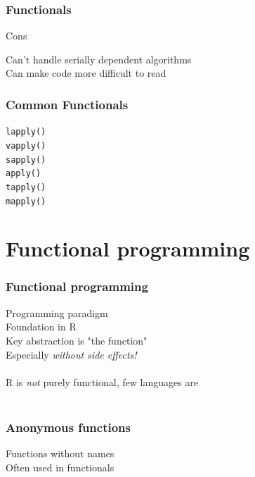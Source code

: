 \documentclass{beamer}
\begin{document}
\begin{frame}
	\frametitle{Functionals}
	\centerline{Cons}
	\begin{center}
		Can't handle serially dependent algorithms \\
		Can make code more difficult to read
	\end{center}
\end{frame}

\begin{frame}
	\frametitle{Common Functionals}
	\begin{center}
		\texttt{lapply()} \\
		\texttt{vapply()} \\
		\texttt{sapply()} \\
		\texttt{apply()} \\
		\texttt{tapply()} \\
		\texttt{mapply()} \\
	\end{center}
\end{frame}

\section{Functional programming}

\begin{frame}
	\frametitle{Functional programming}
	\begin{center}
		Programming paradigm \\
		Foundation in R \\
		Key abstraction is "the function" \\
		Especially \textit{without side effects!} \\~\\
		
		R is \textit{not} purely functional, few languages are \\~\\
	\end{center}
\end{frame}

\begin{frame}
	\frametitle{Anonymous functions}
	\begin{center}
		Functions without names \\
		Often used in functionals
	\end{center}
\end{frame}
\end{document}
